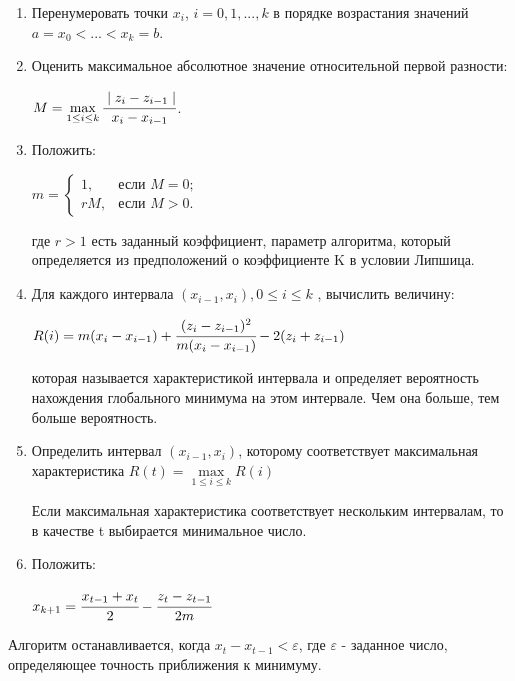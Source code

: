 \documentclass{report}
\begin{document}
\begin{enumerate}
\item Перенумеровать точки $x_i$, $i = 0, 1, ..., k$ в порядке возрастания значений $a = x_0 < ... < x_k = b$.
\item Оценить максимальное абсолютное значение относительной первой разности: 
\par $M = \max\limits_{ 1 \le i \le k} \cfrac{\mid z_i - z_{i-1} \mid}{x_i - x_{i-1}}$.
\item Положить: 
\par $m = \begin{cases}
1, &\text{если $M = 0$;}\\
rM, &\text{если $M > 0$.}
\end{cases}$
\par где $r > 1$ есть заданный коэффициент, параметр алгоритма, который определяется из предположений о коэффициенте K в условии Липшица.
\item Для каждого интервала $(x_{i-1}, x_i), 0 \le i \le k$ , вычислить величину:
\par $R(i) = m(x_i - x_{i-1}) + \cfrac{(z_i - z_{i - 1})^2}{m(x_i - x_{i-1})} - 2(z_i + z_{i - 1})$
\par которая называется характеристикой интервала и определяет вероятность нахождения глобального минимума на этом интервале. Чем она больше, тем больше вероятность.
\item Определить интервал $(x_{i-1}, x_i)$, которому соответствует максимальная характеристика $R(t) = \max\limits_{ 1 \le i \le k} R(i)$
\par Если максимальная характеристика соответствует нескольким интервалам,
то в качестве t выбирается минимальное число.
\item Положить:
\par $x_{k + 1} = \cfrac{x_{t - 1} + x_t}{2} - \cfrac{z_t - z_{t-1}}{2m}$
\end{enumerate}
\par Алгоритм останавливается, когда $x_t - x_{t - 1} < \varepsilon$, где $\varepsilon$ - заданное число, определяющее точность приближения к минимуму.

\newpage
{}

\end{document}
